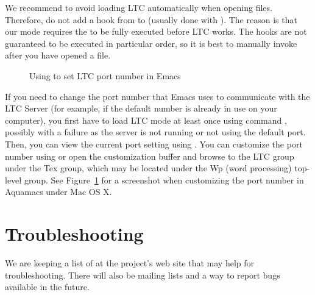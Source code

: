 We recommend to avoid loading LTC automatically when opening  files.  Therefore, do not add a hook from  to  (usually done with ).   The reason is that our mode requires the  to be fully executed before LTC works. The hooks are not guaranteed to be executed in particular order, so it is best to manually invoke  after you have opened a  file.

\begin{figure}[t]
\centering
{}
\caption{Using  to set LTC port number in Emacs} \label{fig:emacs-port}
\end{figure}

If you need to change the port number that Emacs uses to communicate with the LTC Server (for example, if the default number is already in use on your computer), you first have to load LTC mode at least once using command , possibly with a failure as the server is not running or not using the default port.  Then, you can view the current port setting using .  You can customize the port number using  or open the customization buffer and browse to the LTC group under the Tex group, which may be located under the Wp (word processing) top-level group.  See Figure~\ref{fig:emacs-port} for a screenshot when customizing the port number in Aquamacs under Mac OS X.

%

\section{Troubleshooting}

We are keeping a list of  at the project's web site that may help for troubleshooting.  There will also be mailing lists and a way to report bugs available in the future.
